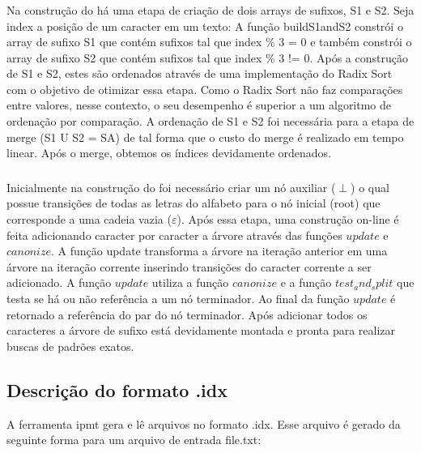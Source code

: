 \subsubsection{\lsa}

Na construção do \lsa há uma etapa de criação de dois arrays de sufixos, S1 e S2.
Seja index a posição de um caracter em um texto:  A função buildS1andS2 constrói
o array de sufixo S1 que contém sufixos tal que index \% 3 = 0 e também constrói
o array de sufixo S2 que contém sufixos tal que index \% 3 != 0. Após a
construção de S1 e S2, estes são ordenados através de uma implementação do Radix
Sort com o objetivo de otimizar essa etapa. Como o Radix Sort não faz
comparações entre valores, nesse contexto, o seu desempenho é superior a um
algoritmo de ordenação por comparação. A ordenação de S1 e S2 foi necessária
para a etapa de merge (S1  U  S2 = SA)  de tal forma que o custo do merge é
realizado em tempo linear. Após o merge, obtemos os índices devidamente
ordenados.

\subsubsection{\lst}
Inicialmente na construção do \lst foi necessário criar um nó auxiliar ($\perp$) o qual possue transições de todas as letras do alfabeto para o nó inicial (root) que corresponde a uma cadeia vazia ($\varepsilon$). Após essa etapa, uma construção on-line é feita adicionando caracter por caracter a árvore através das funções $update$ e $canonize$. A função update transforma a árvore na iteração anterior em uma árvore na iteração corrente inserindo transições do caracter corrente a ser adicionado. A função $update$ utiliza a função $canonize$ e a função $test_and_split$ que testa se há ou não referência a um nó terminador. Ao final da função $update$ é retornado a referência do par do nó terminador. Após adicionar todos os caracteres a árvore de sufixo está devidamente montada e pronta para realizar buscas de padrões exatos.

\subsubsection{\lz}

\subsection{Descrição do formato .idx}

A ferramenta ipmt gera e lê arquivos no formato .idx. Esse arquivo é gerado da
seguinte forma para um arquivo de entrada file.txt:

